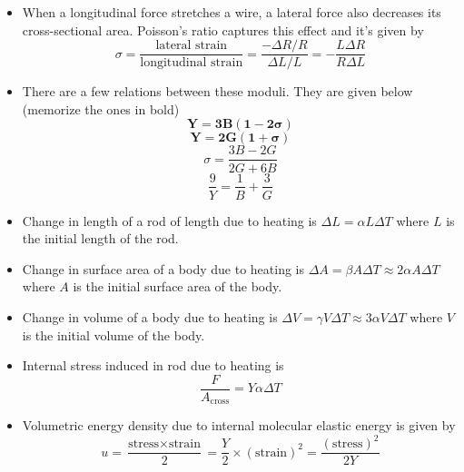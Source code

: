 \documentclass{scrartcl}
\begin{document}
\begin{itemize}
        \item When a longitudinal force stretches a wire, a lateral force also decreases its cross-sectional area. Poisson's ratio captures this effect and it's given by \[\sigma=\frac{\text{lateral strain}}{\text{longitudinal strain}}=\frac{-\Delta R/R}{\Delta L/L}=-\frac{L\Delta R}{R\Delta L}\]
        \item There are a few relations between these moduli. They are given below (memorize the ones in bold) \[\mathbf{Y=3B(1-2\sigma)}\]\[\mathbf{Y=2G(1+\sigma)}\]\[\sigma=\frac{3B-2G}{2G+6B}\]\[\frac9Y=\frac1B+\frac3G\]
        \item Change in length of a rod of length due to heating is $\Delta L=\alpha L\Delta T$ where $L$ is the initial length of the rod.
        \item Change in surface area of a body due to heating is $\Delta A=\beta A\Delta T\approx2\alpha A\Delta T$ where $A$ is the initial surface area of the body.
        \item Change in volume of a body due to heating is $\Delta V=\gamma V\Delta T\approx3\alpha V\Delta T$ where $V$ is the initial volume of the body.
        \item Internal stress induced in  rod due to heating is \[\frac F{A_\text{cross}}=Y\alpha\Delta T\]
        \item Volumetric energy density due to internal molecular elastic energy is given by \[u=\frac{\text{stress}\times\text{strain}}2=\frac Y2\times(\text{strain})^2=\frac{(\text{stress})^2}{2Y}\]
    \end{itemize}
\end{document}

